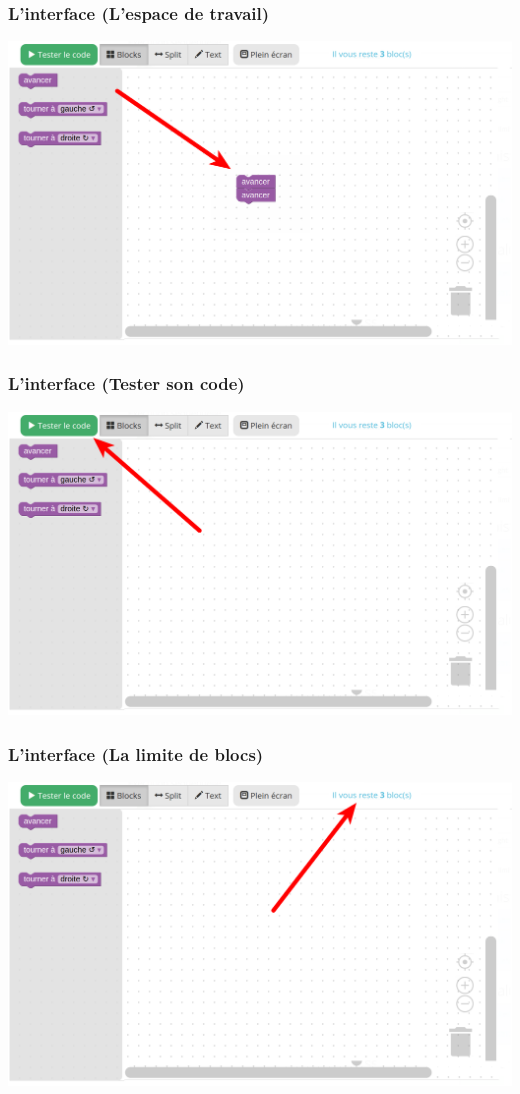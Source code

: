 \documentclass{beamer}
\begin{document}
\begin{frame}
	\frametitle{L'interface (L'espace de travail)}

	\includegraphics[width=\linewidth]{interface_workspace.png}
\end{frame}

\begin{frame}
	\frametitle{L'interface (Tester son code)}

	\includegraphics[width=\linewidth]{interface_codetest.png}
\end{frame}

\begin{frame}
	\frametitle{L'interface (La limite de blocs)}

	\includegraphics[width=\linewidth]{interface_blockslimit.png}
\end{frame}
\end{document}
